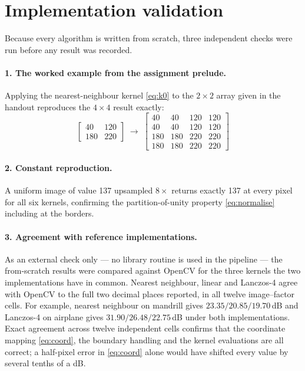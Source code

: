 \documentclass[11pt,a4paper]{article}
\begin{document}
\section{Implementation validation}
\label{sec:validation}

Because every algorithm is written from scratch, three independent checks were run before any
result was recorded.

\paragraph{1. The worked example from the assignment prelude.} Applying the nearest-neighbour
kernel \eqref{eq:k0} to the $2\times2$ array given in the handout reproduces the $4\times4$
result exactly:
\[
\begin{bmatrix} 40 & 120 \\ 180 & 220 \end{bmatrix}
\;\longrightarrow\;
\begin{bmatrix}
40 & 40 & 120 & 120 \\
40 & 40 & 120 & 120 \\
180 & 180 & 220 & 220 \\
180 & 180 & 220 & 220
\end{bmatrix}
\]

\paragraph{2. Constant reproduction.} A uniform image of value 137 upsampled $8\times$ returns
exactly 137 at every pixel for all six kernels, confirming the partition-of-unity property
\eqref{eq:normalise} including at the borders.

\paragraph{3. Agreement with reference implementations.} As an external check only --- no
library routine is used in the pipeline --- the from-scratch results were compared against
OpenCV for the three kernels the two implementations have in common. Nearest neighbour, linear
and Lanczos-4 agree with OpenCV to the full two decimal places reported, in all twelve
image--factor cells. For example, nearest neighbour on mandrill gives
$23.35 / 20.85 / 19.70$\,dB and Lanczos-4 on airplane gives $31.90 / 26.48 / 22.75$\,dB under
both implementations. Exact agreement across twelve independent cells confirms that the
coordinate mapping \eqref{eq:coord}, the boundary handling and the kernel evaluations are all
correct; a half-pixel error in \eqref{eq:coord} alone would have shifted every value by
several tenths of a dB.
\end{document}
